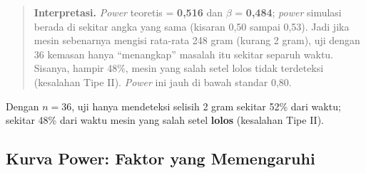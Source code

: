 \documentclass[
  indonesian,
  letterpaper,
]{book}
\begin{document}
\begin{quote}
\textbf{Interpretasi.} \emph{Power} teoretis = \textbf{0,516} dan
\(\beta\) = \textbf{0,484}; \emph{power} simulasi berada di sekitar
angka yang sama (kisaran 0,50 sampai 0,53). Jadi jika mesin sebenarnya
mengisi rata-rata 248 gram (kurang 2 gram), uji dengan 36 kemasan hanya
``menangkap'' masalah itu sekitar separuh waktu. Sisanya, hampir 48\%,
mesin yang salah setel lolos tidak terdeteksi (kesalahan Tipe II).
\emph{Power} ini jauh di bawah standar 0,80.
\end{quote}

Dengan \(n = 36\), uji hanya mendeteksi selisih 2 gram sekitar 52\% dari
waktu; sekitar 48\% dari waktu mesin yang salah setel \textbf{lolos}
(kesalahan Tipe II).

\subsection{Kurva Power: Faktor yang
Memengaruhi}\label{kurva-power-faktor-yang-memengaruhi}
\end{document}
